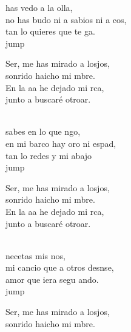 \begin{cancion}%
	 has vedo a la olla, \\
	no has budo ni a sabios ni a cos,\\
	tan lo quieres que  te ga.\\jump\\
	\begin{chorus}%
	Ser, me has mirado a losjos,\\
	sonrido haicho mi mbre.\\
	En la aa he dejado mi rca,\\
	junto a  buscaré otroar.\\
	\end{chorus}%
	\jump\\
	 sabes en lo que ngo, \\
	en mi barco hay oro ni espad,\\
	tan lo redes y mi abajo\\jump\\
	\begin{chorus}%
	Ser, me has mirado a losjos,\\
	sonrido haicho mi mbre.\\
	En la aa he dejado mi rca,\\
	junto a  buscaré otroar.\\
	\end{chorus}%
	\jump\\
	 necetas mis nos, \\
	mi cancio que a otros desnse,\\
	amor que iera segu ando.\\jump\\
	\begin{chorus}%
	Ser, me has mirado a losjos,\\
	sonrido haicho mi mbre.\\

\end{chorus}
\end{cancion}
